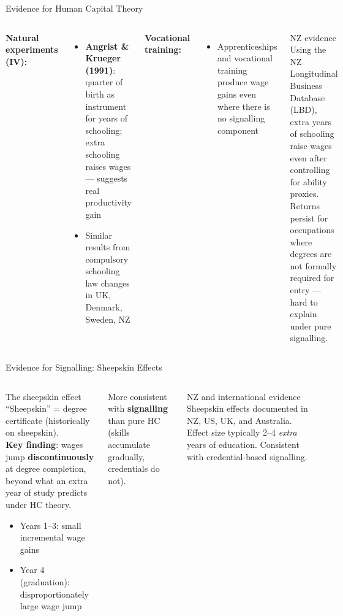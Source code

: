 \documentclass[aspectratio=169, 12pt]{beamer}
\begin{document}
\begin{frame}{Evidence for Human Capital Theory}
  \begin{columns}
      \footnotesize \textbf{Natural experiments (IV):}
      \begin{itemize}
        \item \textbf{Angrist \& Krueger (1991)}: quarter of birth as instrument for
              years of schooling; extra schooling raises wages --- suggests real productivity gain
        \item Similar results from compulsory schooling law changes in UK, Denmark, Sweden, NZ
      \end{itemize}
      \textbf{Vocational training:}
      \begin{itemize}
        \item Apprenticeships and vocational training produce wage gains even where there is no
              signalling component
      \end{itemize}
      \begin{exampleblock}{NZ evidence}
        \footnotesize Using the NZ Longitudinal Business Database (LBD), extra years of schooling
        raise wages even after controlling for ability proxies.\\[0.2em]
        Returns persist for occupations where degrees are not formally required for entry ---
        hard to explain under pure signalling.
      \end{exampleblock}
  \end{columns}
\end{frame}

\begin{frame}{Evidence for Signalling: Sheepskin Effects}
  \begin{columns}
      \begin{block}{The sheepskin effect}
        \footnotesize ``Sheepskin'' = degree certificate (historically on sheepskin).\\[0.1em]
        \textbf{Key finding}: wages jump \textbf{discontinuously} at degree completion,
        beyond what an extra year of study predicts under HC theory.
        \begin{itemize}
          \item Years 1--3: small incremental wage gains
          \item Year 4 (graduation): disproportionately large wage jump
        \end{itemize}
      \end{block}
      \footnotesize More consistent with \textbf{signalling} than pure HC (skills accumulate gradually, credentials do not).
      \begin{alertblock}{NZ and international evidence}
        \footnotesize Sheepskin effects documented in NZ, US, UK, and Australia. Effect size
        typically 2--4 \textit{extra} years of education. Consistent with credential-based
        signalling.
      \end{alertblock}
  \end{columns}
\end{frame}
\end{document}
